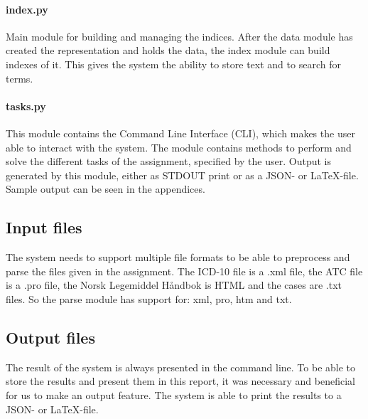 \paragraph{index.py}
Main module for building and managing the indices. After the data module has created the representation and holds the data, the index module can build indexes of it. This gives the system the ability to store text and to search for terms.

\paragraph{tasks.py}
This module contains the Command Line Interface (CLI), which makes the user able to interact with the system. The module contains methods to perform and solve the different tasks of the assignment, specified by the user. Output is generated by this module, either as STDOUT print or as a JSON- or LaTeX-file. Sample output can be seen in the appendices. 


\subsection{Input files}
\label{inputfiles}
The system needs to support multiple file formats to be able to preprocess and parse the files given in the assignment. The ICD-10 file is a .xml file, the ATC file is a .pro file, the Norsk Legemiddel Håndbok is HTML and the cases are .txt files. So the parse module has support for: xml, pro, htm and txt. 

\subsection{Output files}
The result of the system is always presented in the command line. To be able to store the results and present them in this report, it was necessary and beneficial for us to make an output feature. The system is able to print the results to a JSON- or LaTeX-file. 


